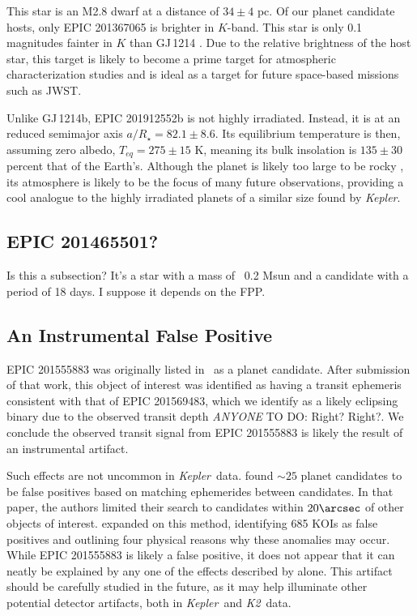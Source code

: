 \documentclass{emulateapj}
\newcommand{\ars}{{$a/R_{\star}$}}
\newcommand{\project}[1]{\textsl{#1}}
\newcommand{\kep}{\project{Kepler}}
\newcommand{\KT}{\project{K2}}
\newcommand{\paperit}{\citet{Foreman-Mackey15}}
\newcommand{\todo}[3]{{\color{#2} \emph{#1} TO DO: #3}}
\newcommand{\anytodo}[1]{\todo{ANYONE}{NavyBlue}{#1}}
\begin{document}
This star is an M2.8 dwarf at a distance of $34\pm4$ pc.
Of our planet candidate hosts, only EPIC 201367065 \citep[originally
discovered by][]{Crossfield15} is brighter in $K$-band.
This star is only 0.1 magnitudes fainter in $K$ than GJ\,1214
\citep{Charbonneau09}.
Due to the relative brightness of the host star, this target is likely
to become a prime target for atmospheric characterization studies
and is ideal as a target for future space-based missions such as JWST.

Unlike GJ\,1214b, EPIC 201912552b is not highly irradiated.
Instead, it is at an reduced semimajor axis \ars$ = 82.1 \pm 8.6$.
Its equilibrium temperature is then, assuming zero albedo, $T_{eq} = 275 \pm 15$
K, meaning its bulk insolation is $135 \pm 30$ percent that of the Earth's.
Although the planet is likely too large to be rocky \citep{Rogers14},
its atmosphere is likely to be the focus of many future observations, providing
a cool analogue to the highly irradiated planets of a similar size found by
\kep.



\subsection{EPIC 201465501?}
Is this a subsection? It's a star with a mass of ~0.2 Msun and a candidate with
a period of 18 days. I suppose it depends on the FPP.

\subsection{An Instrumental False Positive}

EPIC 201555883 was originally listed in \paperit\ as a planet candidate.
After submission of that work, this object of interest was identified as
having a transit ephemeris consistent with that of EPIC 201569483,
which we identify as a likely eclipsing binary due to the observed transit
depth \anytodo{Right? Right?}.
We conclude the observed transit signal from EPIC 201555883 is likely the result
of an instrumental artifact.

Such effects are not uncommon in \kep\ data.
\citet{Batalha13} found $\sim 25$ planet candidates to be false positives based on matching
ephemerides between candidates.
In that paper, the authors limited their search to candidates within $20\arcsec$ of other
objects of interest.
\citet{Coughlin14} expanded on this method, identifying 685 KOIs as false positives and
outlining four physical reasons why these anomalies may occur.
While EPIC 201555883 is likely a false positive, it does not appear that it can neatly be
explained by any one of the effects described by \citet{Coughlin14} alone.
This artifact should be carefully studied in the future, as it may help illuminate other
potential detector artifacts, both in \kep\ and \KT\ data.
\end{document}
